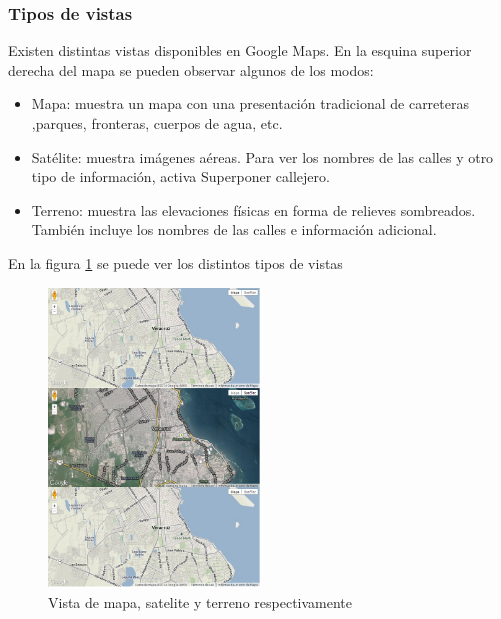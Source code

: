      \subsubsection{Tipos de vistas}
        Existen distintas vistas disponibles en Google Maps. En la esquina superior          derecha del mapa se pueden observar algunos de los modos:
    \begin{itemize} 
         \item Mapa: muestra un mapa con una presentación tradicional de carreteras             ,parques, fronteras, cuerpos de agua, etc.
          \item Satélite: muestra imágenes aéreas. Para ver los nombres de las                 calles y otro tipo de información, activa Superponer callejero.
          \item Terreno: muestra las elevaciones físicas en forma de relieves                      sombreados. También incluye los nombres de las calles e información                 adicional.
     \end{itemize} 
    
    En la figura \ref {fig:Cap2_3_2} se puede ver los distintos tipos de vistas
     
    \begin{figure}[hbtp]
        \centering 
            \includegraphics[width=0.5\textwidth]{Imagenes/Cap2_3_2.png}
            \caption{Vista de mapa, satelite y terreno respectivamente}  
            \label{fig:Cap2_3_2}
    \end{figure}
    
    
